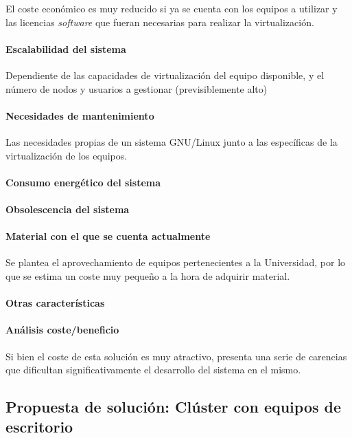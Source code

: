 El coste económico es muy reducido si ya se cuenta con los equipos a utilizar y las licencias \textit{software} que fueran necesarias para realizar la virtualización.

\paragraph{Escalabilidad del sistema}

Dependiente de las capacidades de virtualización del equipo disponible, y el número de nodos y usuarios a gestionar (previsiblemente alto)

\paragraph{Necesidades de mantenimiento}

Las necesidades propias de un sistema GNU/Linux junto a las específicas de la virtualización de los equipos.

\paragraph{Consumo energético del sistema}
\paragraph{Obsolescencia del sistema}

\paragraph{Material con el que se cuenta actualmente}
Se plantea el aprovechamiento de equipos pertenecientes a la Universidad, por lo que se estima un coste muy pequeño a la hora de adquirir material.
\paragraph{Otras características}

\paragraph{Análisis coste/beneficio}

Si bien el coste de esta solución es muy atractivo, presenta una serie de carencias que dificultan significativamente el desarrollo del sistema en el mismo. 


\subsection{Propuesta de solución: Clúster con equipos de escritorio}

